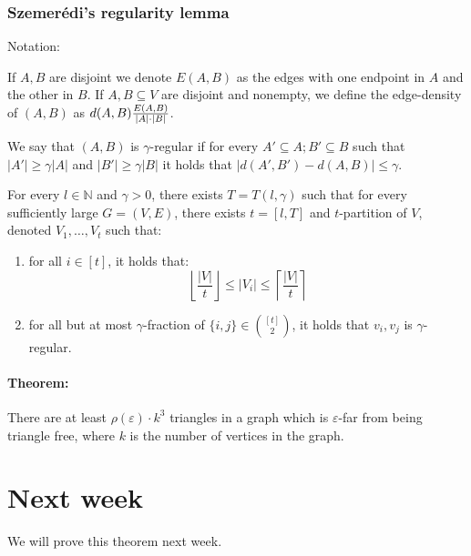\documentclass{idc_msc}
\let\defeq\relax
\newcommand\defeq{\stackrel{\mathclap{\normalfont\mbox{def}}}{=}}
\begin{document}
\subsubsection{Szemer\'edi's regularity lemma}

Notation:

If \(A, B\) are disjoint we denote \(E(A, B)\) as the edges with one endpoint in \(A\) and the other in \(B\).
If \(A, B \subseteq V\) are disjoint and nonempty, we define the edge-density of \((A, B)\) as \(d(A, B) \defeq \frac{E(A,B)}{|A|\cdot |B|}\).

We say that \((A,B)\) is \(\gamma\)-regular if for every \(A' \subseteq A; B' \subseteq B\) such that \(|A'| \ge \gamma |A|\) and \(|B'| \ge \gamma |B|\) it holds that \(|d(A',B')-d(A,B)| \le \gamma\).


For every \(l \in \mathbb{N}\) and \(\gamma > 0\), there exists \(T = T(l, \gamma)\) such that for every sufficiently large \(G = (V,E)\), there exists \(t = [l, T]\) and \(t\)-partition of \(V\), denoted \(V_1, \ldots, V_t\) such that:

\begin{enumerate}
  \item for all \(i \in [t]\), it holds that:
  \[
  \left\lfloor \frac{|V|}{t} \right\rfloor \le |V_i| \le \left\lceil \frac{|V|}{t} \right\rceil
  \]

  \item for all but at most \(\gamma\)-fraction of \(\{i,j\} \in \binom{[t]}{2}\), it holds that \(v_i, v_j\) is \(\gamma\)-regular.
\end{enumerate}

\paragraph{Theorem:}

There are at least \(\rho(\varepsilon) \cdot k^3\) triangles in a graph which is \(\varepsilon\)-far from being triangle free, where \(k\) is the number of vertices in the graph.

\section{Next week}

We will prove this theorem next week.
\end{document}
